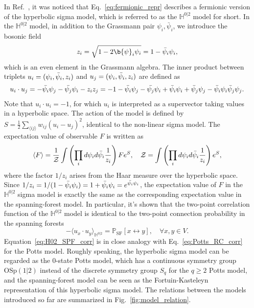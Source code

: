 In Ref.~, it was noticed that Eq.~\eqref{eq:fermionic_repr} describes a fermionic version of the hyperbolic sigma model, which 
is referred to as the $\mathbb{H}^{0|2}$ model for short. In the $\mathbb{H}^{0|2}$ model, in addition to the Grassmann pair $\psi_i, \bar{\psi}_i$, we introduce
the bosonic field
\begin{equation}
	z_i = \sqrt{1 - 2\b{\psi}_i\psi_i} = 1-\bar{\p}_i\p_i,
\end{equation}
which is an even element in the Grassmann algebra. The inner product between triplets $u_i = ({\psi}_i, \bar{{\psi}}_i, z_i)$ and 
$u_j = ({\psi}_i, \bar{{\psi}}_i, z_i)$ are defined as
\begin{equation}
	u_i \cdot u_j = -\bar{{\psi}_i}{\psi}_j - \bar{{\psi}_j}{\psi}_i - z_i z_j = -1 - \bar{{\psi}_i}{\psi}_j - \bar{{\psi}_j}{\psi}_i + \bar{{\psi}}_i{\psi}_i + \bar{{\psi}}_j{\psi}_j
	-\bar{{\psi}}_i{\psi}_i\bar{{\psi}}_j{\psi}_j.
\end{equation}
Note that $u_i \cdot u_i = -1$, for which $u_i$ is interpreted as a supervector taking values in a hyperbolic space. 
The action of the model is defined by $S = \frac{1}{2}\sum_{\langle ij \rangle} w_{ij}(u_i - u_j)^2$, identical to the non-linear sigma model.
The expectation value of observable $F$ is written as
\begin{equation}
	\langle F \rangle = \frac{1}{{\mathcal Z}} \int \left(\prod_{i}d{\psi}_i d\bar{{\psi}}_i \frac{1}{z_i}\right) F e^S,
	\quad {\mathcal Z} = \int \left(\prod_{i}d{\psi}_i d\bar{{\psi}}_i \frac{1}{z_i}\right) e^S,
\end{equation}
where the factor $1/z_i$ arises from the Haar measure over the hyperbolic space. Since $1/z_i = 1/(1-\bar{{\psi}_i}{\psi}_i) = 1 + \bar{{\psi}_i}{\psi}_i = e^{\bar{{\psi}_i}{\psi}_i}$,
the expectation value of $F$ in the $\mathbb{H}^{0|2}$ sigma model is exactly the same as the corresponding expectation value in the spanning-forest model.
In particular, it's shown that the two-point correlation function of the $\mathbb{H}^{0|2}$ model is identical to the two-point connection probability 
in the spanning forests
\begin{equation}\label{eq:H02_SPF_corr}
-\langle u_x \cdot u_y \rangle_{\mathbb{H}^{0|2}} = \mathbb{P}_{\text{SF}}[x \leftrightarrow y], \quad \forall x, y \in V.
\end{equation}
Equation~\eqref{eq:H02_SPF_corr} is in close analogy with Eq.~\eqref{eq:Potts_RC_corr} for the Potts model. Roughly speaking,
the hyperbolic sigma model can be regarded as the $0$-state Potts model, which has a continuous symmetry group $\text{OSp}(1|2)$
instead of the discrete symmetry group $S_q$ for the $q\geq2$ Potts model, and the spanning-forest model can be seen as the
Fortuin-Kasteleyn representation of this hyperbolic sigma model. The relations between the models introduced so far are summarized in Fig.~\ref{fig:model_relation}.

